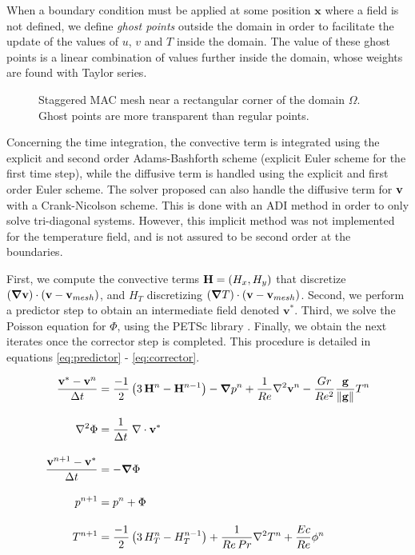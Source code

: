 \documentclass[11 pt]{article}
\begin{document}
When a boundary condition must be applied at some position $\mathbf{x}$ where a field is not defined, we define \textit{ghost points} outside the domain in order to facilitate the update of the values of $u$, $v$ and $T$ inside the domain. The value of these ghost points is a linear combination of values further inside the domain, whose weights are found with Taylor series.

\begin{figure}[H]
    \centering
    
    \caption{Staggered MAC mesh near a rectangular corner of the domain $\Omega$. Ghost points are more transparent than regular points.}
    \label{fig:macMesh}
\end{figure}


Concerning the time integration, the convective term is integrated using the explicit and second order Adams-Bashforth scheme (explicit Euler scheme for the first time step), while the diffusive term is handled using the explicit and first order Euler scheme. The solver proposed can also handle the diffusive term for $\mathbf{v}$ with a Crank-Nicolson scheme. This is done with an ADI method in order to only solve tri-diagonal systems. However, this implicit method was not implemented for the temperature field, and is not assured to be second order at the boundaries.

First, we compute the convective terms $\mathbf{H} = (H_x, H_y)$ that discretize $(\boldsymbol\nabla \mathbf{v}) \cdot (\mathbf{v} - \mathbf{v}_{mesh})$, and $H_T$ discretizing $(\boldsymbol \nabla T) \cdot (\mathbf{v} - \mathbf{v}_{mesh})$. Second, we perform a predictor step to obtain an intermediate field denoted $\mathbf{v}^*$. Third, we solve the Poisson equation for $\Phi$, using the PETSc library \cite{petsc-efficient}. 
Finally, we obtain the next iterates once the corrector step is completed. This procedure is detailed in equations \eqref{eq:predictor} - \eqref{eq:corrector}.

\begin{align}
    \frac{\mathbf{v}^* - \mathbf{v}^n}{\Delta t} &= \frac{-1}{2} \left(3\,\mathbf{H}^n - \mathbf{H}^{n-1}\right) - \boldsymbol{\nabla} p^n + \frac{1}{Re} \nabla^2 \mathbf{v}^n - \frac{Gr}{Re^2} \frac{\mathbf{g}}{\left\|\mathbf{g}\right\|} T^n \label{eq:predictor} \\[10pt]
    \nabla^2\Phi &= \frac{1}{\Delta t} \; \nabla \cdot \mathbf{v}^*\\[10pt]
    \frac{\mathbf{v}^{n+1} - \mathbf{v}^*}{\Delta t} &= -\boldsymbol{\nabla} \Phi\\[10pt]
    p^{n+1} &= p^n + \Phi\\[10pt]
    T^{n+1} &= \frac{-1}{2} \left(3\, H_T^n - H_T^{n-1}\right) + \frac{1}{Re\, Pr} \nabla^2 T^n + \frac{Ec}{Re} \phi^n \label{eq:corrector}
\end{align}
\end{document}
